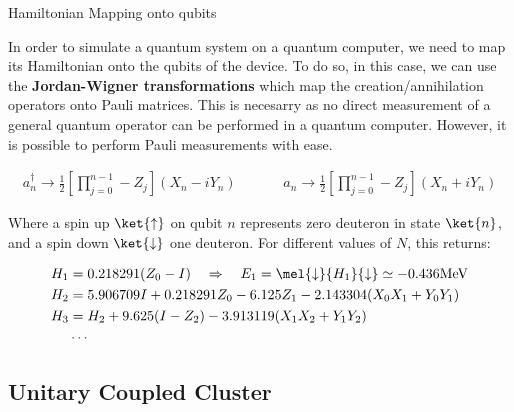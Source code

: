 \documentclass[9pt, handout, aspectratio=169]{beamer}		%
\begin{document}
	\begin{frame}{Hamiltonian Mapping onto qubits}

		In order to simulate a quantum system on a quantum computer, we need to map its Hamiltonian onto the qubits of the device. To do so, in this case, we can use the \textbf{Jordan-Wigner transformations} which map the creation/annihilation operators onto Pauli matrices. This is necesarry as no direct measurement of a general quantum operator can be performed in a quantum computer. However, it is possible to perform Pauli measurements with ease.

		\begin{align*}
			a^{\dagger}_{n} \rightarrow \frac{1}{2} \left[ \prod^{n-1}_{j=0} -Z_j \right] (X_n - i Y_n)
			\hspace{40pt}
			a_{n} \rightarrow \frac{1}{2} \left[ \prod^{n-1}_{j=0} -Z_j \right] (X_n + i Y_n)
		\end{align*}

		Where a spin up $\ket{\uparrow}$ on qubit $n$ represents zero deuteron in state $\ket{n}$, and a spin down $\ket{\downarrow}$ one deuteron. For different values of $N$, this returns:

		\begin{align*}
			H_1 &= 0.218291(Z_0 - I) \quad \Rightarrow \quad E_1 = \mel{\downarrow}{H_1}{\downarrow} \simeq -0.436 \text{MeV} \\
			H_2 &= 5.906709 I + 0.218291 Z_0 - 6.125 Z_1 - 2.143304(X_0 X_1 + Y_0 Y_1) \\
			H_3 &= H_2 + 9.625(I-Z_2) - 3.913119(X_1 X_2 + Y_1 Y_2) \\
			&\cdots
		\end{align*}

		\vspace{-20pt}

	\end{frame}


	\subsection{Unitary Coupled Cluster}
\end{document}
